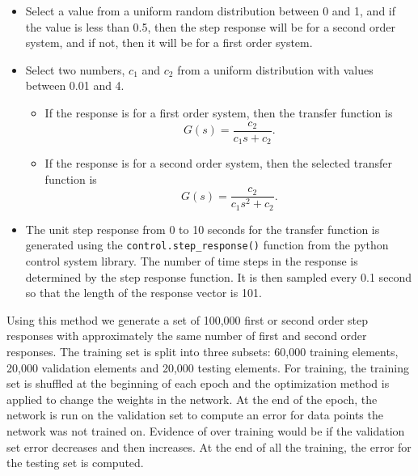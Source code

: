   \begin{itemize}

    \item Select a value from a uniform random distribution between 0 and 1, and
    if the value is less than 0.5, then the step response will be for a second
    order system, and if not, then it will be for a first order system.

    \item Select two numbers, $c_1$ and $c_2$ from a uniform distribution with
    values between 0.01 and 4.

    \begin{itemize}

      \item If the response is for a first order system, then the transfer
      function is
      \[
        G(s) = \frac{c_2}{c_1 s + c_2}.
      \]

      \item If the response is for a second order system, then the selected
      transfer function is
      \[
        G(s) = \frac{c_2}{c_1 s^2 + c_2}.
      \]

    \end{itemize}

	\item The unit step response from 0 to 10 seconds for the transfer function
	  is generated using the \texttt{control.step\_response()} function from the
	  python control system library. The number of time steps in the response is
	  determined by the step response function. It is then sampled every 0.1
	  second so that the length of the response vector is 101.

\end{itemize} 

    Using this method we generate a set of 100,000 first or second order step
    responses with approximately the same number of first and second order
    responses. The training set is split into three subsets: 60,000 training
    elements, 20,000 validation elements and 20,000 testing elements. For
    training, the training set is shuffled at the beginning of each epoch and
    the optimization method is applied to change the weights in the network.  At
    the end of the epoch, the network is run on the validation set to compute an
    error for data points the network was not trained on. Evidence of
    over training would be if the validation set error decreases and then
    increases.  At the end of all the training, the error for the testing set is
    computed.

